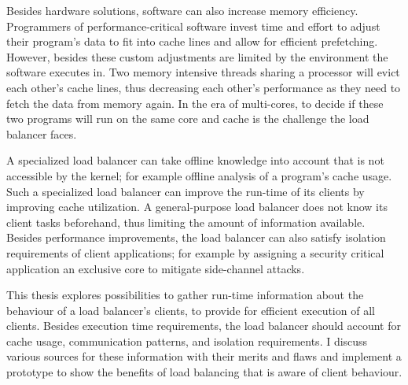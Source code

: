 Besides hardware solutions, software can also increase memory efficiency.
Programmers of performance-critical software invest time and effort to adjust
their program's data to fit into cache lines and allow for efficient prefetching.
However, besides these custom adjustments are limited by the
environment the software executes in.
Two memory intensive threads sharing a processor will evict each other's
cache lines, thus decreasing each other's performance as they need to fetch the
data from memory again.
In the era of multi-cores, to decide if these two programs will run on
the same core and cache is the challenge the load balancer faces.

\begin{comment}
While Linux runs a scheduler which is also in charge of load balancing, these
are two separate jobs.
It is the scheduler's duty to provide an equal amount of CPU time to each
running task, depending on the task's priority.
To decide, which tasks runs on which core on the other hand,
that is the responsibility of the load balancer.

Thus, the load balancer is not necessarily part of the kernel.
To allow for workload specific load balancers, Linux provides an interface to
overrule kernel decisions.
This is also the case for the Fiasco.OC microkernel and the L4Re user-land
environment.
\end{comment}

A specialized load balancer can take offline knowledge into account that is not
accessible by the kernel;
for example offline analysis of a program's cache usage.
Such a specialized load balancer can improve the run-time of its clients by
improving cache utilization.
A general-purpose load balancer does not know its client tasks
beforehand, thus limiting the amount of information available.
Besides performance improvements, the load balancer can also satisfy isolation
requirements of client applications; for example by assigning a security
critical application an exclusive core to mitigate side-channel attacks.

This thesis explores possibilities to gather run-time information about the
behaviour of a load balancer's clients, to provide for efficient execution of
all clients.
Besides execution time requirements, the load balancer should account for cache usage,
communication patterns, and isolation requirements.
I discuss various sources for these information with their merits and flaws and
implement a prototype to show the benefits of load balancing that is aware of
client behaviour.
\pagebreak

